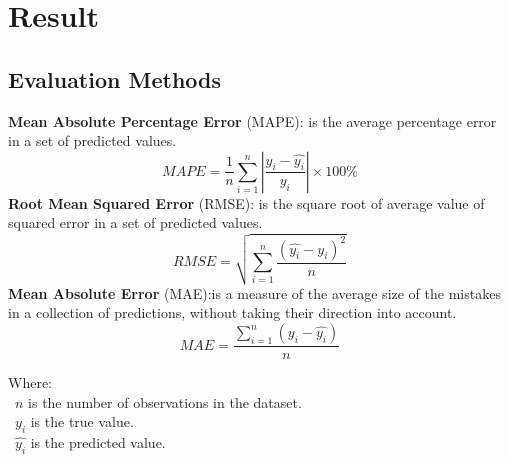 \documentclass{ieeeojies}
\begin{document}
	
	\section{Result}
	\subsection{Evaluation Methods}
	\textbf{Mean Absolute Percentage Error} (MAPE): is the average percentage error in a set of predicted values. \cite{b18}
	\[MAPE = \frac{1}{n} \sum_{i=1}^n \left| \frac{y_i - \hat{y_i}}{y_i} \right| \times 100\%\]
	\textbf{Root Mean Squared Error} (RMSE): is the square root of average value of squared error in a set of predicted values. \cite{b19}
	\[RMSE=\sqrt{\sum_{i=1}^{n} \frac{(\hat{y_i}-y_i )^2}{n} }\]
	\textbf{Mean Absolute Error} (MAE):is a measure of the average size of the mistakes in a collection of predictions, without taking their direction into account. \cite{b20} \[MAE=\frac{\sum_{i=1}^{n} (y_i - \hat{y_i})}{n}\]
	
	Where: \\
	\indent\textbullet\ \(n\) is the number of observations in the dataset.\\
	\indent\textbullet\ \(y_i\)  is the true value.\\
	\indent\textbullet\ \(\hat{y_i}\) is the predicted value.
	
\end{document}
